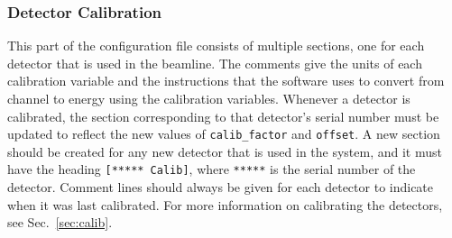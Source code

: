 \subsubsection{Detector Calibration}

This part of the configuration file consists of multiple sections, one for each
detector that is used in the beamline. The comments give the units of each
calibration variable and the instructions that the software uses to convert from
channel to energy using the calibration variables. Whenever a detector is
calibrated, the section corresponding to that detector's serial number must be
updated to reflect the new values of \verb|calib_factor| and \texttt{offset}. A
new section should be created for any new detector that is used in the system,
and it must have the heading \verb|[***** Calib]|, where \verb|*****| is the
serial number of the detector. Comment lines should always be given for each
detector to indicate when it was last calibrated. For more information on
calibrating the detectors, see Sec.~\ref{sec:calib}.
